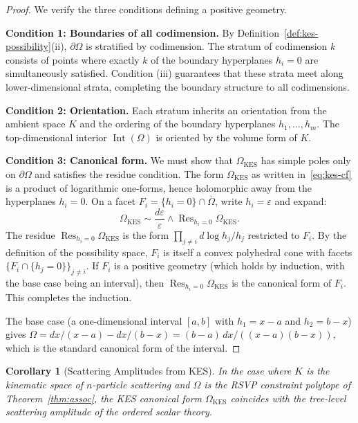 \documentclass[12pt, oneside]{amsart}
\theoremstyle{plain}
\newtheorem{corollary}[theorem]{Corollary}
\theoremstyle{definition}
\theoremstyle{remark}
\DeclareMathOperator{\Res}{Res}
\DeclareMathOperator{\Int}{Int}
\newcommand{\eps}{\varepsilon}
\newcommand{\OmKS}{\Omega}
\newcommand{\CF}{\Omega}   %
\begin{document}
\begin{proof}
We verify the three conditions defining a positive geometry.

\textbf{Condition 1: Boundaries of all codimension.} By Definition~\ref{def:kes-possibility}(ii), $\partial\OmKS$ is stratified by codimension. The stratum of codimension $k$ consists of points where exactly $k$ of the boundary hyperplanes $h_i = 0$ are simultaneously satisfied. Condition (iii) guarantees that these strata meet along lower-dimensional strata, completing the boundary structure to all codimensions.

\textbf{Condition 2: Orientation.} Each stratum inherits an orientation from the ambient space $K$ and the ordering of the boundary hyperplanes $h_1, \ldots, h_m$. The top-dimensional interior $\Int(\OmKS)$ is oriented by the volume form of $K$.

\textbf{Condition 3: Canonical form.} We must show that $\CF_{\text{KES}}$ has simple poles only on $\partial\OmKS$ and satisfies the residue condition. The form $\CF_{\text{KES}}$ as written in~\eqref{eq:kes-cf} is a product of logarithmic one-forms, hence holomorphic away from the hyperplanes $h_i = 0$. On a facet $F_i = \{h_i = 0\} \cap \overline{\OmKS}$, write $h_i = \eps$ and expand:
\[
  \CF_{\text{KES}} \sim \frac{d\eps}{\eps} \wedge \Res_{h_i = 0}\CF_{\text{KES}}.
\]
The residue $\Res_{h_i=0}\CF_{\text{KES}}$ is the form $\prod_{j \neq i} d\log h_j / h_j$ restricted to $F_i$. By the definition of the possibility space, $F_i$ is itself a convex polyhedral cone with facets $\{F_i \cap \{h_j = 0\}\}_{j \neq i}$. If $F_i$ is a positive geometry (which holds by induction, with the base case being an interval), then $\Res_{h_i=0}\CF_{\text{KES}}$ is the canonical form of $F_i$. This completes the induction.

The base case (a one-dimensional interval $[a,b]$ with $h_1 = x - a$ and $h_2 = b - x$) gives $\CF = dx/(x-a) - dx/(b-x) = (b-a)\,dx/((x-a)(b-x))$, which is the standard canonical form of the interval. \end{proof}

\begin{corollary}[Scattering Amplitudes from KES]
\label{cor:kes-amplitudes}
In the case where $K$ is the kinematic space of $n$-particle scattering and $\OmKS$ is the RSVP constraint polytope of Theorem~\ref{thm:assoc}, the KES canonical form $\CF_{\text{KES}}$ coincides with the tree-level scattering amplitude of the ordered scalar theory.
\end{corollary}
\end{document}
